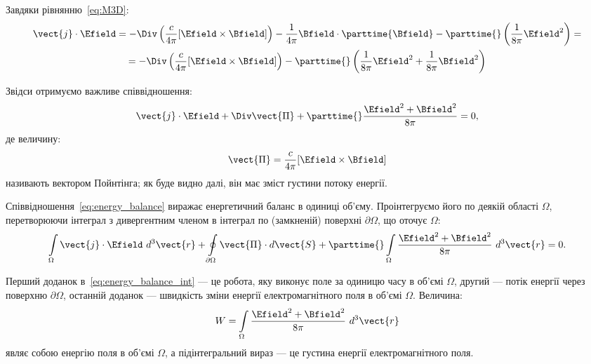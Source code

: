 Завдяки рівнянню~\eqref{eq:M3D}:
\begin{multline*}
	\vect{j}\cdot\Efield =  - \Div\left(\frac{c}{4\pi}[\Efield\times\Bfield]\right) - \frac{1}{4\pi}  \Bfield\cdot
	\parttime{\Bfield}  -
	\parttime{} \left( \frac1{8\pi}\Efield^2\right) = \\
	= - \Div\left(\frac{c}{4\pi}[\Efield\times\Bfield]\right) -  \parttime{} \left(
	\frac1{8\pi}\Efield^2 +
	\frac1{8\pi}\Bfield^2 \right)
\end{multline*}

Звідси отримуємо важливе співвідношення:
\begin{equation}\label{eq:energy_balance}
	\vect{j}\cdot\Efield + \Div\vect{\Pi} +  \parttime{} \frac{\Efield^2 + \Bfield^2}{8\pi}  = 0,
\end{equation}
де величину:
\begin{equation}
	\vect{\Pi} = \frac{c}{4\pi}[\Efield\times\Bfield]
\end{equation}
називають вектором Пойнтінга; як буде видно далі, він має зміст густини потоку енергії.

Співвідношення~\eqref{eq:energy_balance} виражає енергетичний баланс в одиниці об'єму. Проінтегруємо його по деякій
області $\Omega$, перетворюючи інтеграл з дивергентним членом в інтеграл по (замкненій) поверхні $\partial\Omega$, що
оточує $\Omega$:
\begin{equation}\label{eq:energy_balance_int}
	\int\limits_{\Omega} \vect{j}\cdot\Efield \ d^3\vect{r} + \oint\limits_{\partial\Omega} \vect{\Pi}\cdot d\vect{S} +  \parttime{} \int\limits_{\Omega}
	\frac{\Efield^2 + \Bfield^2}{8\pi} \ d^3\vect{r}  = 0.
\end{equation}

Перший доданок в~\eqref{eq:energy_balance_int} --- це робота, яку виконує поле за одиницю часу в об'ємі $\Omega$, другий
--- потік енергії через поверхню $\partial\Omega$, останній доданок --- швидкість зміни енергії електромагнітного поля в
об'ємі $\Omega$. Величина:
\begin{equation}
	W = \int\limits_{\Omega}     \frac{\Efield^2 + \Bfield^2}{8\pi} \ d^3\vect{r}
\end{equation}
являє собою енергію поля в об'ємі $\Omega$, а підінтегральний вираз --- це густина енергії електромагнітного поля.


